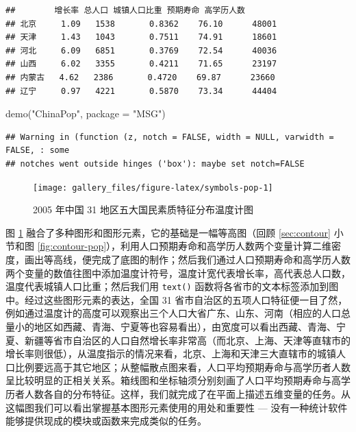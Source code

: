 \documentclass[
  b5paper,
  UTF8,twoside]{book}
\newenvironment{Shaded}{\begin{snugshade}}{\end{snugshade}}
\newcommand{\AttributeTok}[1]{\textcolor[rgb]{0.77,0.63,0.00}{#1}}
\newcommand{\FunctionTok}[1]{\textcolor[rgb]{0.00,0.00,0.00}{#1}}
\newcommand{\NormalTok}[1]{#1}
\newcommand{\StringTok}[1]{\textcolor[rgb]{0.31,0.60,0.02}{#1}}
\begin{document}
\begin{verbatim}
##        增长率 总人口 城镇人口比重 预期寿命 高学历人数
## 北京     1.09   1538       0.8362    76.10      48001
## 天津     1.43   1043       0.7511    74.91      18601
## 河北     6.09   6851       0.3769    72.54      40036
## 山西     6.02   3355       0.4211    71.65      23197
## 内蒙古   4.62   2386       0.4720    69.87      23660
## 辽宁     0.97   4221       0.5870    73.34      44404
\end{verbatim}





\begin{Shaded}
\begin{Highlighting}[]
\FunctionTok{demo}\NormalTok{(}\StringTok{"ChinaPop"}\NormalTok{, }\AttributeTok{package =} \StringTok{"MSG"}\NormalTok{)}
\end{Highlighting}
\end{Shaded}

\begin{verbatim}
## Warning in (function (z, notch = FALSE, width = NULL, varwidth = FALSE, : some
## notches went outside hinges ('box'): maybe set notch=FALSE
\end{verbatim}

\begin{figure}

{\centering \texttt{[image: gallery\_files/figure-latex/symbols-pop-1]} 

}

\caption[中国 31 地区五大国民素质特征分布温度计图]{2005 年中国 31 地区五大国民素质特征分布温度计图}\label{fig:symbols-pop}
\end{figure}

图 \ref{fig:symbols-pop} \citep{Xie08} 融合了多种图形和图形元素，它的基础是一幅等高图（回顾 \ref{sec:contour} 小节和图 \ref{fig:contour-pop}），利用人口预期寿命和高学历人数两个变量计算二维密度，画出等高线，便完成了底图的制作；然后我们通过人口预期寿命和高学历人数两个变量的数值往图中添加温度计符号，温度计宽代表增长率，高代表总人口数，温度代表城镇人口比重；然后我们用 \texttt{text()} 函数将各省市的文本标签添加到图中。经过这些图形元素的表达，全国 31 省市自治区的五项人口特征便一目了然，例如通过温度计的高度可以观察出三个人口大省广东、山东、河南（相应的人口总量小的地区如西藏、青海、宁夏等也容易看出），由宽度可以看出西藏、青海、宁夏、新疆等省市自治区的人口自然增长率非常高（而北京、上海、天津等直辖市的增长率则很低），从温度指示的情况来看，北京、上海和天津三大直辖市的城镇人口比例要远高于其它地区；从整幅散点图来看，人口平均预期寿命与高学历者人数呈比较明显的正相关关系。箱线图和坐标轴须分别刻画了人口平均预期寿命与高学历者人数各自的分布特征。这样，我们就完成了在平面上描述五维变量的任务。从这幅图我们可以看出掌握基本图形元素使用的用处和重要性 --- 没有一种统计软件能够提供现成的模块或函数来完成类似的任务。
\end{document}
